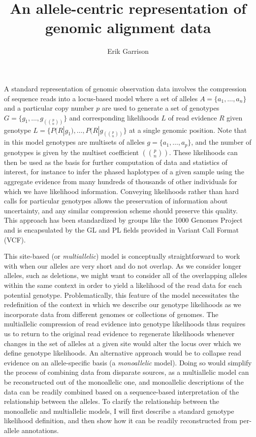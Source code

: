 \documentclass{article}
\begin{document}
\title{An allele-centric representation of genomic alignment data}

\author{Erik Garrison}

\maketitle

A standard representation of genomic observation data involves the compression of sequence reads into a locus-based model where a set of alleles $A = \{ a_1, \ldots, a_n \}$ and a particular copy number $p$ are used to generate a set of genotypes $G = \{ g_1, \ldots, g_{\left({p \choose n}\right)} \}$ and corresponding likelihoods $L$ of read evidence $R$ given genotype $L = \{ P(R|g_1), \ldots, P(R|g_{ \left({p \choose n}\right) } \}$ at a single genomic position. Note that in this model genotypes are multisets of alleles $g = \{ a_1, \dots, a_p \}$, and the number of genotypes is given by the multiset coefficient $\left({p \choose n}\right)$. These likelihoods can then be used as the basis for further computation of data and statistics of interest, for instance to infer the phased haplotypes of a given sample using the aggregate evidence from many hundreds of thousands of other individuals for which we have likelihood information. Conveying likelihoods rather than hard calls for particular genotypes allows the preservation of information about uncertainty, and any similar compression scheme should preserve this quality. This approach has been standardized by groups like the 1000 Genomes Project and is encapsulated by the GL and PL fields provided in Variant Call Format (VCF).

This site-based (or \emph{multiallelic}) model is conceptually straightforward to work with when our alleles are very short and do not overlap. As we consider longer alleles, such as deletions, we might want to consider all of the overlapping alleles within the same context in order to yield a likelihood of the read data for each potential genotype. Problematically, this feature of the model necessitates the redefinition of the context in which we describe our genotype likelihoods as we incorporate data from different genomes or collections of genomes. The multiallelic compression of read evidence into genotype likelihoods thus requires us to return to the original read evidence to regenerate likelihoods whenever changes in the set of alleles at a given site would alter the locus over which we define genotype likelihoods. An alternative approach would be to collapse read evidence on an allele-specific basis (a \emph{monoallelic} model). Doing so would simplify the process of combining data from disparate sources, as a multiallelic model can be reconstructed out of the monoallelic one, and monoallelic descriptions of the data can be readily combined based on a sequence-based interpretation of the relationship between the alleles. To clarify the relationship between the monoallelic and multiallelic models, I will first describe a standard genotype likelihood definition, and then show how it can be readily reconstructed from per-allele annotations.
\end{document}
